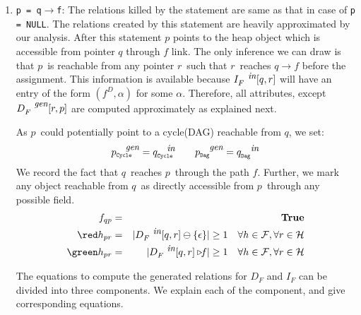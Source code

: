 \documentclass[runningheads,a4paper]{llncs}
\newcommand{\p}{\ensuremath{p}}
\newcommand{\q}{\ensuremath{q}}
\newcommand{\myr}{\ensuremath{r}}
\newcommand{\drct}{\ensuremath{D}}
\newcommand{\heap}{\ensuremath{\mathcal{H}}}
\newcommand{\fields}{\ensuremath{\mathcal{F}}}
\newcommand{\subC}{\mbox{\scalebox{.6}{\Cycle}}}
\newcommand{\subD}{\mbox{\scalebox{.6}{\Dag}}}
\newcommand{\epsilonset}{\ensuremath{\{\epsilon\}}}
\newcommand{\din}{\mbox{\footnotesize\em in}}
\newcommand{\dgen}{\mbox{\footnotesize\em gen}}
\newcommand{\GenC}[1]{\ensuremath{{#1}_{\subC}^{\dgen}}}
\newcommand{\GenD}[1]{\ensuremath{{#1}_{\subD}^{\dgen}}}
\newcommand{\InC}[1]{\ensuremath{{#1}_{\subC}^{\din}}}
\newcommand{\InD}[1]{\ensuremath{{#1}_{\subD}^{\din}}}
\newcommand{\project}[2]{\ensuremath{#1\triangleright\!\!#2}}
\newcommand{\num}[1]{\ensuremath{|#1|}}
\newcommand{\remOne}[2]{\ensuremath{#1 \ominus #2}}
\newcommand{\Dag}{{\tt Dag}}
\newcommand{\Cycle}{{\tt Cycle}}
\newcommand{\true}{\textbf{True}}
\begin{document}
\begin{enumerate}
\item {\tt p = q$\rightarrow$f}:
 The relations killed by the statement are same as that in
 case of {\tt p = NULL}. The relations
  created by this statement are heavily approximated by our
  analysis.  After this statement $\p$ points to the heap
  object which is accessible from pointer $\q$ through $f$
  link. The only inference we can draw is that \p\ is
  reachable from any pointer \myr\ such that \myr\ reaches
  $\q\rightarrow f$ before the assignment. This information
  is available because $I_F^{\din}[\q, \myr]$ will have an
  entry of the form $(f^\drct, \alpha)$ for some
  $\alpha$. {\red Therefore, all attributes, except $D_F^{\dgen}[\myr,
    \p]$} are computed approximately as explained next.  

  As \p\ could potentially point to a cycle(DAG) reachable
  from \q, we set:
  $$\GenC{p}   = \InC{q}     \qquad \GenD{p} = \InD{q} $$
We record the fact that \q\ reaches \p\ through the path
$f$. Further, we mark any object reachable from \q\ as
directly accessible from \p\ through any possible field.
\begin{eqnarray*}
  f_{\q\p} &=& \true  \\
   {\red h_{\p\myr}} &=&
  \num{\remOne{D_F^{\din}[\q,\myr]}{\epsilonset}} \geq 1\quad
  \forall h \in \fields, \forall \myr \in \heap \\
  {\green h_{\p\myr}} &=&
  \num{\project{D_F^{\din}[\q,\myr]}{f}} \geq 1\quad
  \forall h \in \fields, \forall \myr \in \heap
\end{eqnarray*}

The equations to compute the generated relations for  $D_F$ and $I_F$
can be divided into three components. We explain each of the
component, and give corresponding equations.


\end{enumerate}
\end{document}
